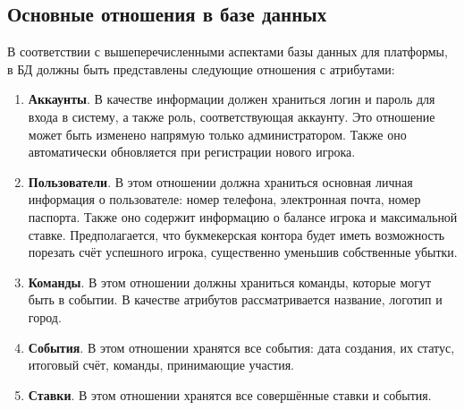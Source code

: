 \subsection{Основные отношения в базе данных}
В соответствии с вышеперечисленными аспектами базы данных для платформы, в БД должны быть представлены следующие отношения с атрибутами:
\begin{enumerate}
	\item \textbf{Аккаунты}. В качестве информации должен храниться логин и пароль для входа в систему, а также роль, соответствующая аккаунту. Это отношение может быть изменено напрямую только администратором. Также оно автоматически обновляется при регистрации нового игрока.
	\item \textbf{Пользователи}. В этом отношении должна храниться основная личная информация о пользователе: номер телефона, электронная почта, номер паспорта. Также оно содержит информацию о балансе игрока и максимальной ставке. Предполагается, что букмекерская контора будет иметь возможность порезать счёт успешного игрока, существенно уменьшив собственные убытки.
	\item \textbf{Команды}. В этом отношении должны храниться команды, которые могут быть в событии. В качестве атрибутов рассматривается название, логотип и город.
	\item \textbf{События}. В этом отношении хранятся все события: дата создания, их статус, итоговый счёт, команды, принимающие участия. 
	\item \textbf{Ставки}. В этом отношении хранятся все совершённые ставки и события.
\end{enumerate}

